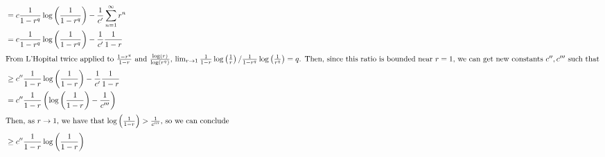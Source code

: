 \documentclass[12pt,letterpaper]{article}
\theoremstyle{definition}
\begin{document}
\begin{align*}
                    &= c\frac{1}{1-r^{q}}\log\left(\frac{1}{1-r^{q}}\right) - \frac{1}{c'}\sum_{n=1}^{\infty}r^{n} \\
                    &= c\frac{1}{1-r^{q}}\log\left(\frac{1}{1-r^{q}}\right) - \frac{1}{c'}\frac{1}{1-r} \\
  \intertext{From L'Hopital twice applied to $\frac{1-r^{q}}{1-r}$ and $\frac{\log(r)}{\log(r^{q})}$, $\lim_{r \rightarrow 1}\frac{1}{1-r}\log\left(\frac{1}{r}\right) / \frac{1}{1-r^{q}}\log\left(\frac{1}{r^{q}}\right) = q$. Then, since this ratio is bounded near $r = 1$, we can get new constants $c'', c'''$ such that}
                    &\geq c''\frac{1}{1-r}\log\left(\frac{1}{1-r}\right) - \frac{1}{c'}\frac{1}{1-r} \\
                    &= c''\frac{1}{1-r}\left(\log\left(\frac{1}{1-r}\right) - \frac{1}{c'''}\right) \\
  \intertext{Then, as $r \rightarrow 1$, we have that $\log\left(\frac{1}{1-r}\right) > \frac{1}{c'''}$, so we can conclude}
                    &\geq c''\frac{1}{1-r}\log\left(\frac{1}{1-r}\right) \\
\end{align*}
\end{document}
